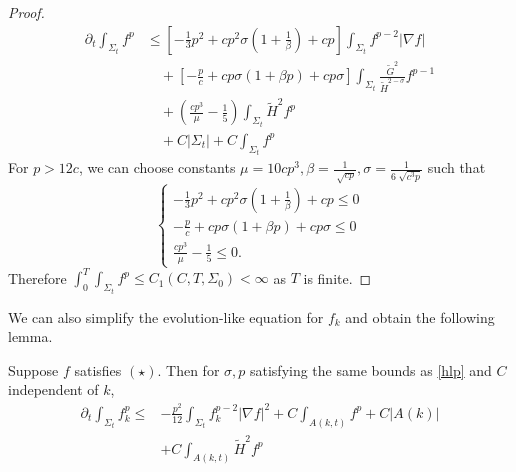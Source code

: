 \begin{proof}
    \begin{equation*}
    \begin{split}
        \partial _t \int_{\Sigma_t} f^p 
    &\leq \left[ -\frac{1}{3}p^2+cp^2 \sigma (1+\frac{1}{\beta })+cp \right] \int_{\Sigma_t} f_{}^{p-2} \left| \nabla f \right|   \\
    &\quad + \left[ -\frac{p}{c}+cp \sigma (1+\beta p)+cp \sigma  \right] \int_{\Sigma_t} \frac{\tilde{G}^2}{\tilde{H}^{2-\sigma }}f^{p-1}\\
    &\quad + \left( \frac{cp^3}{\mu }-\frac{1}{5} \right) \int_{\Sigma_t} \tilde{H}^2f^{p}\\
    &\quad + C \left| \Sigma _t \right| + C \int_{\Sigma_t} f^p
    \end{split}
    \end{equation*} 
    For $p>12c$, we can choose constants $\mu=10cp^3 , \beta=\frac{1}{\sqrt[]{cp}} , \sigma=\frac{1}{6 \sqrt[]{c^3p}} $ such that
    \[
    \begin{cases}
        -\frac{1}{3}p^2+cp^2 \sigma (1+\frac{1}{\beta })+cp \leq 0\\
        -\frac{p}{c}+cp \sigma (1+\beta p)+cp \sigma \leq 0\\
        \frac{cp^3}{\mu }-\frac{1}{5} \leq 0.
    \end{cases}
    \]
    Therefore $\int_{0}^{T}\int_{\Sigma_t} f^p \leq C_1(C,T,\Sigma _0) <\infty$ as $T$ is finite.
\end{proof}

We can also simplify the evolution-like equation for $f_k$ and obtain the following lemma.

\begin{lemma}
    Suppose $f$ satisfies $(\star )$. Then for $\sigma , p$ satisfying the same bounds as \autoref{hlp} and $C$ independent of $k$,
    \begin{equation*}
    \begin{split}
        \partial_t \int_{\Sigma_t} f_k^p \leq &  -\frac{p^2}{12} \int_{\Sigma_t} f_{k}^{p-2}\left| \nabla f \right| ^2+C \int_{A(k,t)} f^p +C \left| A(k) \right|\\ \quad &+ C \int_{A(k,t)}^{}\tilde{H}^2f^p\\
    \end{split}
    \end{equation*}  
\end{lemma}

